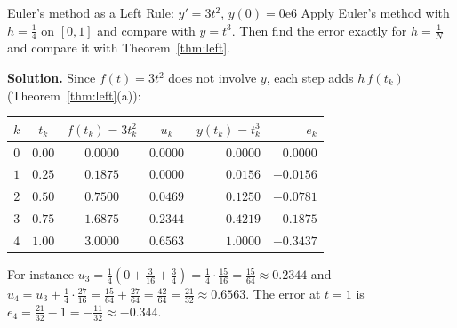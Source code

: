 \documentclass[11pt]{article}
\begin{document}
\begin{exmp}{Euler's method as a Left Rule: $y'=3t^2$, $y(0)=0$}{e6}
Apply Euler's method with $h=\frac14$ on $[0,1]$ and compare with $y=t^3$. Then find the error exactly for $h=\frac1N$ and compare it with Theorem~\ref{thm:left}.

\textbf{Solution.} Since $f(t)=3t^2$ does not involve $y$, each step adds $h\,f(t_k)$ (Theorem~\ref{thm:left}(a)):
\begin{center}
\begin{tabular}{ccccrr}
\toprule $k$ & $t_k$ & $f(t_k)=3t_k^2$ & $u_k$ & $y(t_k)=t_k^3$ & $e_k$ \\\midrule
$0$ & $0.00$ & $0.0000$ & $0.0000$ & $0.0000$ & $0.0000$\\
$1$ & $0.25$ & $0.1875$ & $0.0000$ & $0.0156$ & $-0.0156$\\
$2$ & $0.50$ & $0.7500$ & $0.0469$ & $0.1250$ & $-0.0781$\\
$3$ & $0.75$ & $1.6875$ & $0.2344$ & $0.4219$ & $-0.1875$\\
$4$ & $1.00$ & $3.0000$ & $0.6563$ & $1.0000$ & $-0.3437$\\
\bottomrule
\end{tabular}
\end{center}
For instance $u_3=\frac14\left(0+\frac3{16}+\frac34\right)=\frac14\cdot\frac{15}{16}=\frac{15}{64}\approx0.2344$ and $u_4=u_3+\frac14\cdot\frac{27}{16}=\frac{15}{64}+\frac{27}{64}=\frac{42}{64}=\frac{21}{32}\approx0.6563$. The error at $t=1$ is $e_4=\frac{21}{32}-1=-\frac{11}{32}\approx-0.344$.


\end{exmp}
\end{document}
